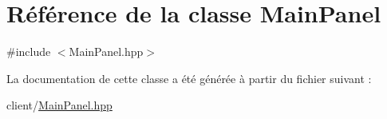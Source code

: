 \hypertarget{classMainPanel}{}\section{Référence de la classe Main\+Panel}
\label{classMainPanel}


{\ttfamily \#include $<$Main\+Panel.\+hpp$>$}



La documentation de cette classe a été générée à partir du fichier suivant \+:\begin{DoxyCompactItemize}
\item 
client/\hyperlink{MainPanel_8hpp}{Main\+Panel.\+hpp}\end{DoxyCompactItemize}
